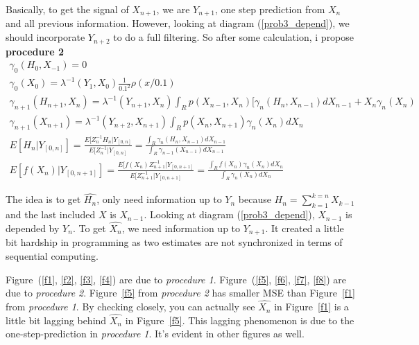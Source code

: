 \documentclass[a4paper,10pt]{article}
\begin{document}
Basically, to get the signal of $X_{n+1}$, we are $Y_{n+1}$, one step prediction from $X_n$ and all previous information. However, looking at diagram (\ref{prob3_depend}), we should incorporate $Y_{n+2}$ to do a full filtering. So after some calculation, i propose \textbf{procedure 2}
\begin{eqnarray}
\gamma_0(H_0, X_{-1}) = 0  \\
\gamma_0(X_0) = \lambda^{-1}(Y_{1}, X_{0})\frac{1}{0.1^2}\rho(x/0.1)  \\
\gamma_{n+1}(H_{n+1}, X_{n}) =  \lambda^{-1}(Y_{n+1}, X_{n}) \int_R p(X_{n-1}, X_n)[\gamma_n(H_n, X_{n-1})dX_{n-1} + X_n \gamma_n(X_n)  \\
\gamma_{n+1}(X_{n+1}) = \lambda^{-1}(Y_{n+2}, X_{n+1}) \int_R p(X_n, X_{n+1}) \gamma_n(X_n)dX_n  \\
E[H_n|Y_{[0,n]}] = \frac{E[Z_n^{-1}H_n|Y_{[0,n]}}{E[Z_n^{-1}|Y_{[0,n]}} = \frac{\int_R \gamma_n(H_n, X_{n-1}) dX_{n-1}}{\int_R \gamma_{n-1}(X_{n-1})dX_{n-1}} \\
E[f(X_n) | Y_{[0,n+1]}] = \frac{E[f(X_n)Z_{n+1}^{-1}|Y_{[0,n+1]}}{E[Z_{n+1}^{-1}|Y_{[0,n+1]}} = \frac{\int_R f(X_n)\gamma_n(X_n)dX_n }{\int_R \gamma_n(X_n)dX_n}
\end{eqnarray}

The idea is to get $\hat{H_n}$, only need information up to $Y_n$ because $H_n = \sum_{k=1}^{k=n} X_{k-1}$ and the last included $X$ is $X_{n-1}$. Looking at diagram (\ref{prob3_depend}), $X_{n-1}$ is depended by $Y_n$. To get $\hat{X_n}$, we need information up to $Y_{n+1}$. It created a little bit hardship in programming as two estimates are not synchronized in terms of sequential computing.

Figure~(\ref{f1}, \ref{f2}, \ref{f3}, \ref{f4}) are due to \emph{procedure 1}. Figure~(\ref{f5}, \ref{f6}, \ref{f7}, \ref{f8}) are due to \emph{procedure 2}. Figure~\ref{f5} from \emph{procedure 2} has smaller MSE than Figure~\ref{f1} from \emph{procedure 1}. By checking closely, you can actually see $\hat{X_n}$ in Figure~\ref{f1} is a little bit lagging behind $\hat{X_n}$ in Figure~\ref{f5}. This lagging phenomenon is due to the one-step-prediction in \emph{procedure 1}. It's evident in other figures as well.
\end{document}
